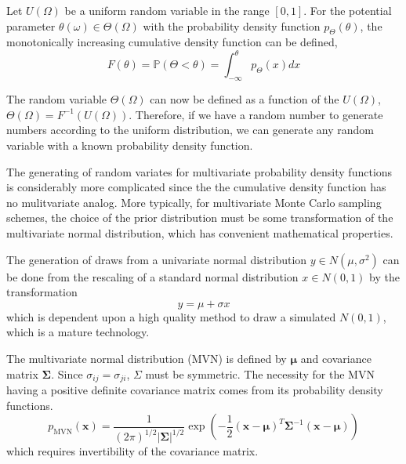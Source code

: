 Let $U(\Omega)$ be a uniform random variable in the range $[0,1]$.  For the potential parameter $\theta(\omega) \in \Theta(\Omega)$ with the probability density function $p_\Theta(\theta)$, the monotonically increasing cumulative density function can be defined,
\begin{equation}
	  F(\theta) = \mathbb{P}(\Theta < \theta) = \int_{-\infty}^\theta p_\Theta(x) dx
\end{equation}

The random variable $\Theta(\Omega)$ can now be defined as a function of the $U(\Omega)$, $\Theta(\Omega)=F^{-1}(U(\Omega))$.  Therefore, if we have a random number to generate numbers according to the uniform distribution, we can generate any random variable with a known probability density function.

The generating of random variates for multivariate probability density functions is considerably more complicated since the the cumulative density function has no mulitvariate analog.  More typically, for multivariate Monte Carlo sampling schemes, the choice of the prior distribution must be some transformation of the multivariate normal distribution, which has convenient mathematical properties\cite{devroye1986}.

The generation of draws from a univariate normal distribution $y \in N(\mu,\sigma^2)$ can be done from the rescaling of a standard normal distribution $x \in N(0,1)$ by the transformation
\begin{equation}
\label{eq:normal_scaling}
	  y = \mu + \sigma x
\end{equation}
which is dependent upon a high quality method to draw a simulated $N(0,1)$, which is a mature technology.

The multivariate normal distribution (MVN) is defined by $\bm{\mu}$ and covariance matrix $\bm{\Sigma}$.
Since  $\sigma_{ij}=\sigma_{ji}$, $\Sigma$ must be symmetric.  The necessity for the MVN having a positive definite covariance matrix comes from its probability density functions.
\begin{equation}
	  p_{\mathrm{MVN}}(\bm{x})
		=
		\frac{1}
		     {(2\pi)^{1/2} |\bm{\Sigma}|^{1/2} }
		\exp\left( -\frac{1}{2} (\bm{x}-\bm{\mu})^T
		                        \bm{\Sigma}^{-1}
														(\bm{x}-\bm{\mu})\right)
\end{equation}
which requires invertibility of the covariance matrix.


